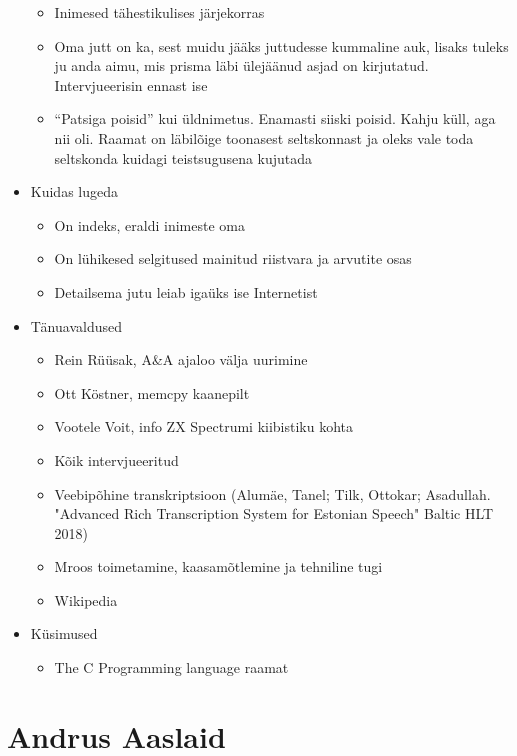 \documentclass{tufte-book}
\let\oldchapter\chapter
\def\chapter{%
  \setcounter{footnote}{0}%
  \oldchapter
}
\begin{document}
\begin{itemize}
\begin{itemize}
		\item Inimesed tähestikulises järjekorras
		\item Oma jutt on ka, sest muidu jääks juttudesse kummaline auk, lisaks tuleks ju anda aimu, mis prisma läbi ülejäänud asjad on kirjutatud. Intervjueerisin ennast ise
		\item \enquote{Patsiga poisid} kui üldnimetus. Enamasti siiski poisid. Kahju küll, aga nii oli. Raamat on läbilõige toonasest seltskonnast ja oleks vale toda seltskonda kuidagi teistsugusena kujutada
	\end{itemize}
	\item Kuidas lugeda
	\begin{itemize}
		\item On indeks, eraldi inimeste oma
		\item On lühikesed selgitused mainitud riistvara ja arvutite osas
		\item Detailsema jutu leiab igaüks ise Internetist
	\end{itemize}
	\item Tänuavaldused
	\begin{itemize}
		\item Rein Rüüsak, A\&A ajaloo välja uurimine
		\item Ott Köstner, memcpy kaanepilt
		\item Vootele Voit, info ZX Spectrumi kiibistiku kohta
		\item Kõik intervjueeritud
		\item Veebipõhine transkriptsioon (Alumäe, Tanel; Tilk, Ottokar; Asadullah. "Advanced Rich Transcription System for Estonian Speech" Baltic HLT 2018)
		\item Mroos toimetamine, kaasamõtlemine ja tehniline tugi
		\item Wikipedia
	\end{itemize}
	\item Küsimused
	\begin{itemize}
		\item The C Programming language raamat
	\end{itemize}
 \end{itemize}

\mainmatter


\chapter{Andrus Aaslaid}

\end{document}
